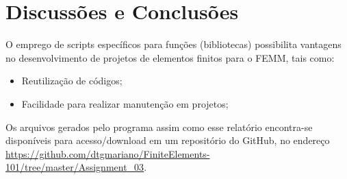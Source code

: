 \section{Discussões e Conclusões}
O emprego de scripts específicos para funções (bibliotecas) possibilita vantagens no desenvolvimento de projetos de elementos finitos para o FEMM, tais como:
\begin{itemize}
  \item Reutilização de códigos;
  \item Facilidade para realizar manutenção em projetos;
\end{itemize}
Os arquivos gerados pelo programa assim como esse relatório encontra-se disponíveis para acesso/download em um repositório do GitHub, no endereço \url{https://github.com/dtgmariano/FiniteElements-101/tree/master/Assignment_03}.
